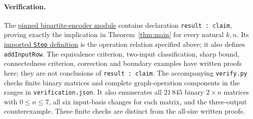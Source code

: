 \documentclass[11pt]{article}
\begin{document}
\paragraph{Verification.}
The \href{https://github.com/the-omega-institute/trureturing/blob/5a1fca9e717166d9d52651194f897dda2b9ff37f/D5/S3/Quantum/Codes/KhesinLiBipartiteEncoderEquivalence.lean}{pinned bipartite-encoder module}
contains declaration \texttt{result : claim}, proving exactly the implication
in Theorem~\ref{thm:main} for every natural $k,n$.
Its \href{https://github.com/the-omega-institute/trureturing/blob/5a1fca9e717166d9d52651194f897dda2b9ff37f/D5/S3/Quantum/Codes/KhesinLiEquivalenceClasses.lean}{imported \texttt{Step} definition}
is the operation relation specified above; it also defines
\texttt{addInputRow}. The equivalence criterion, two-input classification,
sharp bound, connectedness criterion, correction and boundary examples
have written proofs here; they are not conclusions of \texttt{result : claim}.
The accompanying \texttt{verify.py} checks finite binary matrices and
complete graph-operation components in the ranges in \texttt{verification.json}.
It also enumerates all $21\,845$ binary $2\times n$ matrices with
$0\leq n\leq7$, all six input-basis changes for each matrix, and the
three-output counterexample. These finite checks are distinct from the
all-size written proofs.
\end{document}
